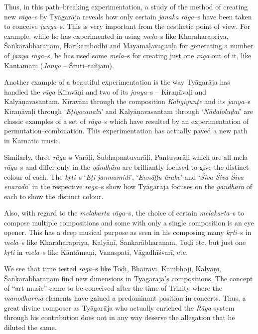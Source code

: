 Thus, in this path–breaking experimentation, a study of the method of creating new \textit{rāga}–s by Tyāgarāja reveals how only certain \textit{janaka rāga}–s have been taken to conceive \textit{janya}–s. This is very important from the aesthetic point of view. For example, while he has experimented in using \textit{mela}–s like Kharaharapriya, Śaṅkarābharaṇam, Harikāmbodhi and Māyāmāḷavagauḷa for generating a number of \textit{janya rāga}–s, he has used some \textit{mela}–s for creating just one \textit{rāga} out of it, like Kāntāmaṇi (\textit{Janya} – Śruti–rañjanī).

Another example of a beautiful experimentation is the way Tyāgarāja has handled the \textit{rāga} Kīravāṇi and two of its \textit{janya}–s – Kiraṇāvaḷi and Kalyāṇavasantam. Kīravāni through the composition \textit{Kaligiyunṭe} and its \textit{janya}–s Kiraṇāvaḷi through ‘\textit{Eṭiyocanalu}’ and Kalyāṇavasantam through ‘\textit{Nādaloluḍai}’ are classic examples of a set of \textit{rāga}–s which have resulted by an experimentation of permutation–combination. This experimentation has actually paved a new path in Karnatic music.

Similarly, three \textit{rāga}–s Varāḷi, Śubhapantuvarāḷi, Pantuvarāḷi which are all mela \textit{rāga}–s and differ only in the \textit{gāndhāra} are brilliantly focused to give the distinct colour of each. The \textit{kṛti}–s ‘\textit{Eṭi janmamidi}’, ‘\textit{Ennāḷḷu ūrake}’ and ‘\textit{Śiva Śiva Śiva enarāda}’ in the respective \textit{rāga}–s show how Tyāgarāja focuses on the \textit{gāndhara} of each to show the distinct colour.

Also, with regard to the \textit{melakarta rāga}–s, the choice of certain \textit{melakarta}–s to compose multiple compositions and some with only a single composition is an eye opener. This has a deep musical purpose as seen in his composing many \textit{kṛti}–s in \textit{mela}–s like Kharaharapriya, Kalyāṇī, Śankarābharaṇam, Toḍi etc. but just one \textit{kṛti} in \textit{mela}–s like Kāntāmaṇi, Vanaspati, Vāgadhīśvarī, etc.

We see that time tested \textit{rāga}–s like Toḍi, Bhairavi, Kāmbhoji, Kalyāṇī, Śankarābharaṇam find new dimensions in Tyāgarāja’s compositions. The concept of “art music” came to be conceived after the time of Trinity where the \textit{manodharma} elements have gained a predominant position in concerts. Thus, a great divine composer as Tyāgarāja who actually enriched the \textit{Rāga} system through his contribution does not in any way deserve the allegation that he diluted the same.


